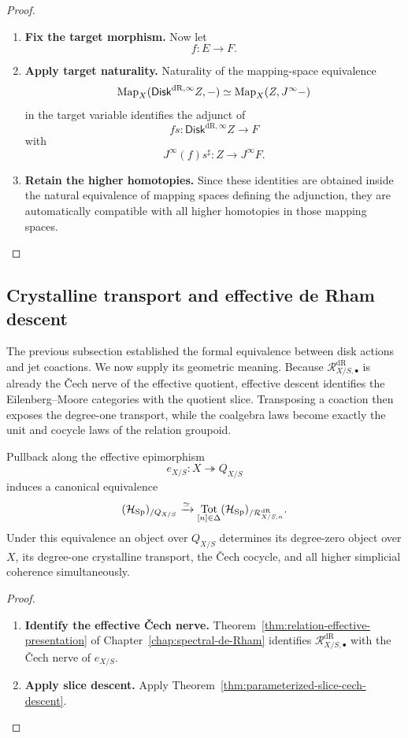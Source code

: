 \begin{proof}
\begin{enumerate}[label=\textup{(\arabic*)}]
    \item \textbf{Fix the target morphism.}
Now let
\[
  f:E\to F.
\]

    \item \textbf{Apply target naturality.}
Naturality of the mapping-space equivalence
\[
  \operatorname{Map}_X(\mathsf{Disk}^{\mathrm{dR},\infty} Z,-)
  \simeq
  \operatorname{Map}_X(Z,J^\infty-)
\]
in the target variable identifies the adjunct of
\[
  fs:\mathsf{Disk}^{\mathrm{dR},\infty} Z\to F
\]
with
\[
  J^\infty(f)s^\sharp:
  Z\to J^\infty F.
\]

    \item \textbf{Retain the higher homotopies.}
Since these identities are obtained inside the natural equivalence of mapping
spaces defining the adjunction, they are automatically compatible with all
higher homotopies in those mapping spaces.
\end{enumerate}
\end{proof}

\subsection{Crystalline transport and effective de Rham descent}
\label{sec:crystalline-descent}

The previous subsection established the formal equivalence between disk actions
and jet coactions. We now supply its geometric meaning. Because
\(\mathcal R^{\mathrm{dR}}_{X/S,\bullet}\) is already the \v{C}ech nerve of the
effective quotient, effective descent identifies the Eilenberg--Moore
categories with the quotient slice. Transposing a coaction then exposes the
degree-one transport, while the coalgebra laws become exactly the unit and
cocycle laws of the relation groupoid.

\begin{proposition}
\label{prop:effective-cech-descent-Q}
Pullback along the effective epimorphism
\[
  e_{X/S}:X\twoheadrightarrow Q_{X/S}
\]
induces a canonical equivalence
\[
  (\mathcal H_{\operatorname{Sp}})_{/Q_{X/S}}
  \xrightarrow{\simeq}
  \operatorname*{Tot}_{[n]\in\Delta}
  (\mathcal H_{\operatorname{Sp}})_{/\mathcal R^{\mathrm{dR}}_{X/S,n}}.
\]
Under this equivalence an object over \(Q_{X/S}\) determines its degree-zero
object over \(X\), its degree-one crystalline transport, the \v{C}ech cocycle, and all
higher simplicial coherence simultaneously.
\end{proposition}

\begin{proof}
\leavevmode
\begin{enumerate}[label=\textup{(\arabic*)}]
    \item \textbf{Identify the effective Čech nerve.}
Theorem~\ref{thm:relation-effective-presentation} of
Chapter~\ref{chap:spectral-de-Rham} identifies
\(\mathcal R^{\mathrm{dR}}_{X/S,\bullet}\) with the \v{C}ech nerve of \(e_{X/S}\).

    \item \textbf{Apply slice descent.}
Apply
Theorem~\ref{thm:parameterized-slice-cech-descent}.
\end{enumerate}
\end{proof}


